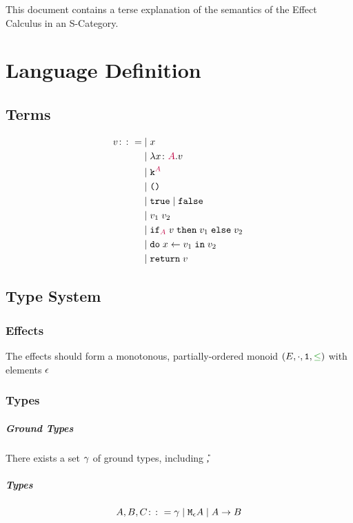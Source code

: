 \documentclass{report}
\begin{document}
\abstract
This document contains a terse explanation of the semantics of the Effect Calculus in an S-Category.

\tableofcontents
\chapter{Language Definition}

\section{Terms}

\begin{equation}
    \begin{split}
        v \colon\colon=& \mid  x \\
        & \mid \lambda x \colon {\color{purple}A}. v\; \\
        & \mid \texttt{k}^{\color{purple} A} \\
        & \mid \texttt{()} \\
        & \mid \texttt{true} \mid \texttt{false} \\
        & \mid v_1\; v_2 \\
        & \mid \texttt{if}_{\textcolor{purple}{A}}\; v\; \texttt{then}\; v_1 \;\texttt{else} \; v_2\; \\
        & \mid \texttt{do}\; x \leftarrow v_1 \;\texttt{in}\; v_2\; \\
        & \mid \texttt{return} \; v\;
        \end{split}
    \end{equation}

\section{Type System}
\subsection{Effects}
The effects should form a monotonous, partially-ordered monoid $(E, \dot, \1, \subeffect)$ with elements $\epsilon$
\subsection{Types}
    \paragraph{Ground Types}
        There exists a set $\gamma$ of ground types, including \U, \B
    \paragraph{Types}
    $$ A, B, C \colon\colon= \gamma \mid \texttt{M}_{\epsilon}{A} \mid A\rightarrow B $$
\end{document}
